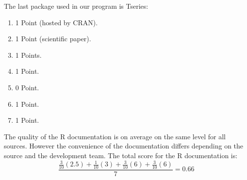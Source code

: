 \documentclass [twoside,
  11pt, a4paper,
  footinclude=true,
  headinclude=true,
  cleardoublepage=empty
]{article}
\begin{document}
The last package used in our program is Tseries:
\begin{enumerate}
    \item 1 Point (hosted by CRAN).
    \item 1 Point (scientific paper).
    \item 1 Points.
    \item 1 Point.
    \item 0 Point.
    \item 1 Point.
    \item 1 Point.
\end{enumerate}
The quality of the R documentation is on average on the same level for all sources. However the convenience of the documentation differs depending on the source and the development team. The total score for the R documentation is:
\[ \frac{\frac{3}{10}(2.5)+\frac{1}{10}(3)+\frac{3}{10}(6)+\frac{3}{10}(6)}{7}= 0.66 \] 
\end{document}
